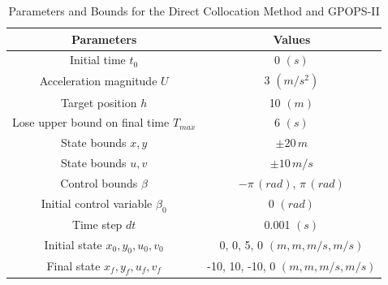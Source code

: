 \begin{table}[H]
	\begin{tabular}{|c|c|}
		\hline
		\textbf{Parameters}                      & \textbf{Values}                    \\
		\hline
		Initial time $t_0$                       & 0 $(s)$                            \\
		\hline
		Acceleration magnitude $U$               & 3 $(m/s^2)$                        \\
		\hline
		Target position $h$                      & 10 $(m)$                           \\
		\hline
		Lose upper bound on final time $T_{max}$ & 6 $(s)$                            \\
		\hline
		State bounds $x, y$                      & $\pm 20\,m$                        \\
		State bounds $u, v$                      & $\pm 10\,m/s$                      \\
		\hline
		Control bounds $\beta$                   & $-\pi\,(rad)$, $\pi\,(rad)$        \\
		\hline
		Initial control variable $\beta_0$       & 0 $(rad)$                          \\
		\hline
		Time step $dt$                           & 0.001 $(s)$                        \\
		\hline
		Initial state $x_0, y_0, u_0, v_0$       & 0, 0, 5, 0 $(m, m, m/s, m/s)$      \\
		\hline
		Final state $x_f, y_f, u_f, v_f$         & -10, 10, -10, 0 $(m, m, m/s, m/s)$ \\
		\hline
	\end{tabular}
	\centering
	\caption{Parameters and Bounds for the Direct Collocation Method and GPOPS-II}
	\label{tab5}
\end{table}

